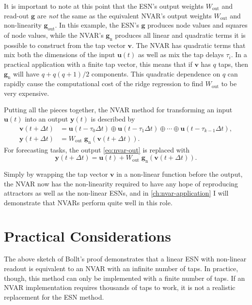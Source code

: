 It is important to note at this point that the ESN's output weights
$W_\text{out}$ and read-out $\bm{g}$ are \emph{not} the same as the
equivalent NVAR's output weights $W_\text{out}$ and non-linearity
$\bm{g}_\text{out}$. In this example, the ESN's $\bm{g}$ produces node values and squares of node
values, while the NVAR's $\bm{g}_\text{n}$ produces all linear and
quadratic terms it is possible to construct from the tap vector
$\bm{v}$. The NVAR has quadratic terms that mix both the dimensions of the input $\bm{u}(t)$ as well as mix the tap delays $\tau_i$. In a practical application with a finite tap vector, this
means that if $\bm{v}$ has $q$ taps, then $\bm{g}_\text{n}$ will have
$q + q(q+1)/2$ components. This quadratic dependence on $q$ can
rapidly cause the computational cost of the ridge regression to find $W_\text{out}$ to be very
expensive.

Putting all the pieces together, the NVAR method for transforming an
input $\bm{u}(t)$ into an output $\bm{y}(t)$ is described by
\begin{align}
  \label{eq:nvar}
  \bm{v}(t + \Delta t) &= \bm{u}(t - \tau_0 \Delta t) \oplus \bm{u}(t - \tau_1 \Delta t) \oplus \cdots \oplus \bm{u}(t - \tau_{k-1} \Delta t), \\
  \label{eq:nvar-out}
  \bm{y}(t + \Delta t) &= W_\text{out}\;\bm{g}_\text{n}\left(\bm{v}(t + \Delta t)\right).
\end{align}
For forecasting tasks, the output \cref{eq:nvar-out} is replaced with
\begin{equation}
  \label{eq:nvar-out-forecast}
  \bm{y}(t + \Delta t) = \bm{u}(t) + W_\text{out}\;\bm{g}_\text{n}\left(\bm{v}(t + \Delta t)\right).
\end{equation}

Simply by wrapping the tap vector $\bm{v}$ in a non-linear function
before the output, the NVAR now has the non-linearity required to have
any hope of reproducing attractors as well as the non-linear ESNs, and
in \cref{ch:nvar-application} I will demonstrate that NVARs perform
quite well in this role.

\section{Practical Considerations}

The above sketch of Bollt's proof demonstrates that a linear ESN with non-linear
readout is equivalent to an NVAR with an infinite number of taps. In
practice, though, this method can only be implemented with a finite
number of taps. If an NVAR implementation requires thousands of taps
to work, it is not a realistic replacement for the ESN method.

